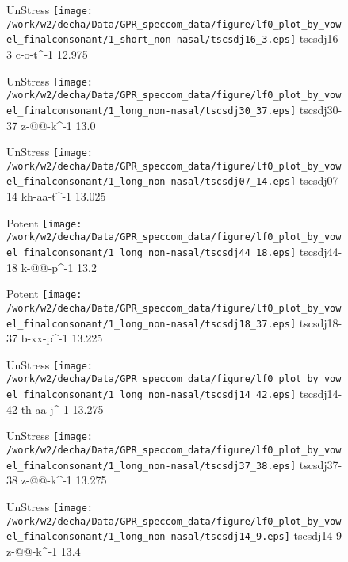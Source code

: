 \documentclass{article}
\begin{document}
\begin{figure}[t]
\begin{minipage}[b]{.24\textwidth}
UnStress
\centering
\texttt{[image: /work/w2/decha/Data/GPR\_speccom\_data/figure/lf0\_plot\_by\_vowel\_finalconsonant/1\_short\_non-nasal/tscsdj16\_3.eps]}
tscsdj16-3 c-o-t\textasciicircum-1 12.975
\end{minipage}
\begin{minipage}[b]{.24\textwidth}
UnStress
\centering
\texttt{[image: /work/w2/decha/Data/GPR\_speccom\_data/figure/lf0\_plot\_by\_vowel\_finalconsonant/1\_long\_non-nasal/tscsdj30\_37.eps]}
tscsdj30-37 z-@@-k\textasciicircum-1 13.0
\end{minipage}
\begin{minipage}[b]{.24\textwidth}
UnStress
\centering
\texttt{[image: /work/w2/decha/Data/GPR\_speccom\_data/figure/lf0\_plot\_by\_vowel\_finalconsonant/1\_long\_non-nasal/tscsdj07\_14.eps]}
tscsdj07-14 kh-aa-t\textasciicircum-1 13.025
\end{minipage}
\begin{minipage}[b]{.24\textwidth}
\colorbox{Apricot}{Potent}
\centering
\texttt{[image: /work/w2/decha/Data/GPR\_speccom\_data/figure/lf0\_plot\_by\_vowel\_finalconsonant/1\_long\_non-nasal/tscsdj44\_18.eps]}
tscsdj44-18 k-@@-p\textasciicircum-1 13.2
\end{minipage}
\end{figure}

\begin{figure}[t]
\begin{minipage}[b]{.24\textwidth}
\colorbox{Apricot}{Potent}
\centering
\texttt{[image: /work/w2/decha/Data/GPR\_speccom\_data/figure/lf0\_plot\_by\_vowel\_finalconsonant/1\_long\_non-nasal/tscsdj18\_37.eps]}
tscsdj18-37 b-xx-p\textasciicircum-1 13.225
\end{minipage}
\begin{minipage}[b]{.24\textwidth}
UnStress
\centering
\texttt{[image: /work/w2/decha/Data/GPR\_speccom\_data/figure/lf0\_plot\_by\_vowel\_finalconsonant/1\_long\_non-nasal/tscsdj14\_42.eps]}
tscsdj14-42 th-aa-j\textasciicircum-1 13.275
\end{minipage}
\begin{minipage}[b]{.24\textwidth}
UnStress
\centering
\texttt{[image: /work/w2/decha/Data/GPR\_speccom\_data/figure/lf0\_plot\_by\_vowel\_finalconsonant/1\_long\_non-nasal/tscsdj37\_38.eps]}
tscsdj37-38 z-@@-k\textasciicircum-1 13.275
\end{minipage}
\begin{minipage}[b]{.24\textwidth}
UnStress
\centering
\texttt{[image: /work/w2/decha/Data/GPR\_speccom\_data/figure/lf0\_plot\_by\_vowel\_finalconsonant/1\_long\_non-nasal/tscsdj14\_9.eps]}
tscsdj14-9 z-@@-k\textasciicircum-1 13.4
\end{minipage}
\end{figure}
\end{document}
